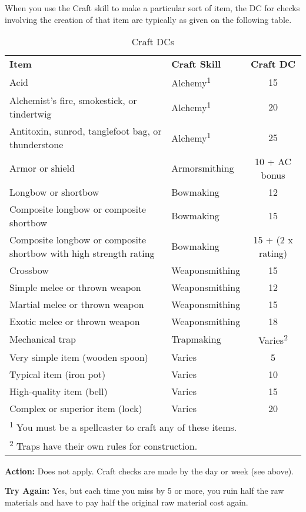 When you use the Craft skill to make a particular sort of item, the DC for checks 
involving the creation of that item are typically as given on the following table.

\begin{table}[htb]
\caption{Craft DCs}
\centering
\begin{tabular}{l l c}
\textbf{Item} & \textbf{Craft Skill} & \textbf{Craft DC}\\
Acid & Alchemy\textsuperscript{1} & 15	\\
Alchemist's fire, smokestick, or tindertwig & Alchemy\textsuperscript{1} & 20\\
Antitoxin, sunrod, tanglefoot bag, or thunderstone & Alchemy\textsuperscript{1} & 25\\
Armor or shield  & Armorsmithing & 10 + AC bonus\\
Longbow or shortbow & Bowmaking & 12\\
Composite longbow or composite shortbow & Bowmaking & 15\\
Composite longbow or composite shortbow with high strength rating & Bowmaking & 15 + (2 x rating)\\
Crossbow & Weaponsmithing & 15\\
Simple melee or thrown weapon & Weaponsmithing & 12\\
Martial melee or thrown weapon & Weaponsmithing & 15\\
Exotic melee or thrown weapon & Weaponsmithing & 18\\
Mechanical trap & 	Trapmaking & Varies\textsuperscript{2}\\
Very simple item (wooden spoon) & Varies & 5\\
Typical item (iron pot) & Varies & 10\\
High-quality item (bell) & Varies & 15\\
Complex or superior item (lock) & Varies & 20\\
\multicolumn{3}{l}{\textsuperscript{1} You must be a spellcaster to craft any of these items.}\\
\multicolumn{3}{l}{\textsuperscript{2} Traps have their own rules for construction.}\\
\end{tabular}
\end{table}

\textbf{Action:} Does not apply. Craft checks are made by the day or week (see 
above).

\textbf{Try Again:} Yes, but each time you miss by 5 or more, you ruin half the 
raw materials and have to pay half the original raw material cost again.

